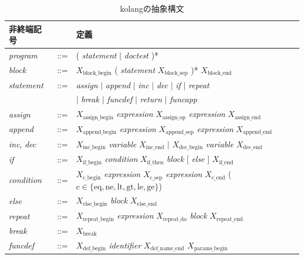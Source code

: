 \documentclass{ipsjprosym}
\begin{document}
\begin{table}[t]
\begin{small}
\caption{kolangの抽象構文}
\label{tab:kolang-bnf}
\centering
\begin{tabular}{l c p{8cm}}
\hline
非終端記号 & & 定義 \\
\hline
\textit{program}     & ::= & ( \textit{statement} $\mid$ \textit{doctest} )* \\
\textit{block}       & ::= & $X_{\mathrm{block\_begin}}$ ( \textit{statement} $X_{\mathrm{block\_sep}}$ )* $X_{\mathrm{block\_end}}$ \\
\textit{statement}   & ::= & \textit{assign} $\mid$ \textit{append} $\mid$ \textit{inc} $\mid$ \textit{dec} $\mid$ \textit{if} $\mid$ \textit{repeat} \\
& & $\mid$ \textit{break} $\mid$ \textit{funcdef} $\mid$ \textit{return} $\mid$ \textit{funcapp} \\
\textit{assign}      & ::= & $X_{\mathrm{assign\_begin}}$ \textit{expression} $X_{\mathrm{assign\_op}}$ \textit{expression} $X_{\mathrm{assign\_end}}$ \\
\textit{append}      & ::= & $X_{\mathrm{append\_begin}}$ \textit{expression} $X_{\mathrm{append\_sep}}$ \textit{expression} $X_{\mathrm{append\_end}}$ \\
\textit{inc}, \textit{dec} & ::= & $X_{\mathrm{inc\_begin}}$ \textit{variable} $X_{\mathrm{inc\_end}}$ $\mid$ $X_{\mathrm{dec\_begin}}$ \textit{variable} $X_{\mathrm{dec\_end}}$ \\
\textit{if}          & ::= & $X_{\mathrm{if\_begin}}$ \textit{condition} $X_{\mathrm{if\_then}}$ \textit{block} [ \textit{else} ] $X_{\mathrm{if\_end}}$ \\
\textit{condition}   & ::= & $X_{\mathrm{c\_begin}}$ \textit{expression} $X_{\mathrm{c\_sep}}$ \textit{expression} $X_{\mathrm{c\_end}}$ \quad ($\mathrm{c} \in \{\mathrm{eq}, \mathrm{ne}, \mathrm{lt}, \mathrm{gt}, \mathrm{le}, \mathrm{ge}\}$) \\
\textit{else}        & ::= & $X_{\mathrm{else\_begin}}$ \textit{block} $X_{\mathrm{else\_end}}$ \\
\textit{repeat}      & ::= & $X_{\mathrm{repeat\_begin}}$ \textit{expression} $X_{\mathrm{repeat\_do}}$ \textit{block} $X_{\mathrm{repeat\_end}}$ \\
\textit{break}       & ::= & $X_{\mathrm{break}}$ \\
\textit{funcdef}     & ::= & $X_{\mathrm{def\_begin}}$ \textit{identifier} $X_{\mathrm{def\_name\_end}}$ $X_{\mathrm{params\_begin}}$ \\

\end{tabular}
\end{small}
\end{table}
\end{document}
